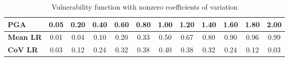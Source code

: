 \begin{table}[htbp]

\centering
\begin{tabular}{ l c c c c c c c c c c c}

\hline
\rowcolor{anti-flashwhite}
\bf{PGA} & 0.05 & 0.20 & 0.40 & 0.60 & 0.80 & 1.00 & 1.20 & 1.40 & 1.60 & 1.80 & 2.00 \\
\hline
\bf{Mean LR} & 0.01 & 0.04 & 0.10 & 0.20 & 0.33 & 0.50 & 0.67 & 0.80 & 0.90 & 0.96 & 0.99 \\
\bf{CoV LR} & 0.03 & 0.12 & 0.24 & 0.32 & 0.38 & 0.40 & 0.38 & 0.32 & 0.24 & 0.12 & 0.03 \\
\hline
\end{tabular}

\caption{Vulnerability function with nonzero coefficients of variation}
\label{tab:vf-tax1-nzcov}
\end{table}